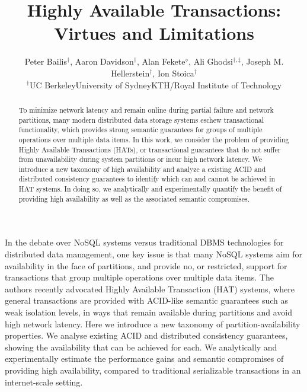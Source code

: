\documentclass{vldb}
\theoremstyle{definition}
\begin{document}

\title{Highly Available Transactions: Virtues and Limitations}
{\author{Peter Bailis{\fontsize{12}{14}$^\dagger$}, Aaron Davidson{\fontsize{12}{14}$^\dagger$}, Alan Fekete{\fontsize{12}{14}$^\diamond$}, Ali Ghodsi{\fontsize{12}{14}$^{\dagger,\ddagger}$}, Joseph M. Hellerstein{\fontsize{12}{14}$^\dagger$}, Ion Stoica{\fontsize{12}{14}$^\dagger$}\\{{\fontsize{12}{14}$^\dagger$}\hspace{.5mm}UC Berkeley\hspace{4mm}{\fontsize{12}{14}$^\diamond$}\hspace{.5mm}University of Sydney\hspace{4mm}{\fontsize{12}{14}$^\ddagger$}\hspace{.5mm}KTH/Royal Institute of Technology}}}
\maketitle

\begin{abstract}
To minimize network latency and remain online during partial failure
and network partitions, many modern distributed data storage systems
eschew transactional functionality, which provides strong semantic
guarantees for groups of multiple operations over multiple data
items. In this work, we consider the problem of providing Highly
Available Transactions (HATs), or transactional guarantees that do not
suffer from unavailability during system partitions or incur high
network latency.  We introduce a new taxonomy of high availability and
analyze a existing ACID and distributed consistency guarantees to
identify which can and cannot be achieved in HAT systems. In doing so,
we analytically and experimentally quantify the benefit of providing
high availability as well as the associated semantic compromises.
\end{abstract}

In the debate over NoSQL systems versus traditional DBMS technologies for distributed data management, one key issue is that many NoSQL systems aim for availability in the face of partitions, and provide no, or restricted, support for transactions that group multiple operations over multiple data items. The authors recently advocated Highly Available Transaction (HAT) systems, where general transactions are provided with ACID-like semantic guarantees such as weak isolation levels, in ways that remain available during partitions and avoid high network latency. Here we introduce a new taxonomy of partition-availability properties. We analyse existing ACID and distributed consistency guarantees, showing the availability that can be achieved for each.  We analytically and experimentally estimate the performance gains and semantic compromises of providing high availability, compared to traditional serializable transactions in an internet-scale setting.
\end{document}
